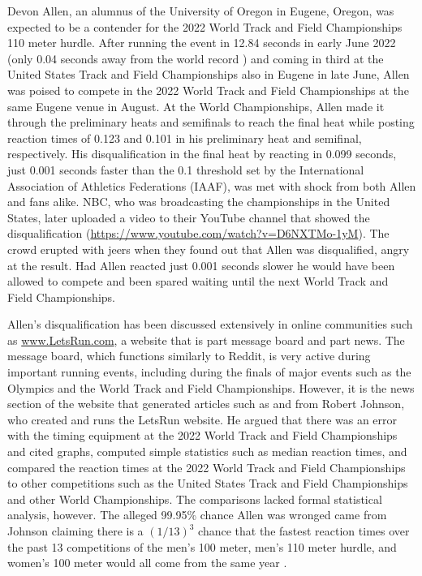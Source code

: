 \documentclass[12pt, letterpaper, titlepage]{article}
\begin{document}
Devon Allen, an alumnus of the University of Oregon in 
Eugene, Oregon, was
expected to be a contender for the 2022 World Track and Field Championships 110 
meter hurdle.  After running the event in 12.84 seconds in early June 2022 
(only 0.04 seconds away from the world record \citep{wa2022preview}) and coming 
in third at the United States Track and Field 
Championships also in Eugene in late June, Allen was poised to compete in the 
2022 World Track and Field Championships at the same Eugene venue in August.
At the World Championships, Allen made it through the preliminary
heats and semifinals to reach the final heat while posting reaction times of 
0.123 and 0.101 in his preliminary heat and semifinal, respectively.  
His disqualification in the final heat by reacting in 0.099 seconds, just 0.001
seconds faster than the 0.1 threshold set by the International Association of
Athletics Federations (IAAF), was met
with shock from both Allen and fans alike.  NBC, who was broadcasting the
championships in the United States, later uploaded a video to their YouTube
channel that showed the disqualification
(\url{https://www.youtube.com/watch?v=D6NXTMo-1yM}).
The crowd erupted with jeers
when they found out that Allen was disqualified, angry at the result.  Had Allen 
reacted just 0.001 seconds slower he would have been allowed to compete and been 
spared waiting until the next World Track and Field Championships.


Allen's disqualification has been discussed extensively in online communities
such as \url{www.LetsRun.com}, a website that is part message board and part
news. The message board,
which functions similarly to Reddit, is very active during important running
events, including during the finals of major events such as
the Olympics and the World Track and Field Championships.  However, it is the
news section of the website that generated articles such as \citet{johnson2022data}
and \citet{johnson2022was} from  Robert Johnson, who created and runs 
the LetsRun website.  He argued that there was an error
with the timing equipment at the 2022 World Track and Field Championships and
cited graphs, computed simple statistics such as median reaction times, and 
compared the reaction times at the 2022 World Track and Field Championships to 
other competitions
such as the United States Track and Field Championships and other World Championships.
The comparisons lacked formal statistical analysis, however. 
The alleged 99.95\% chance Allen was wronged 
came from Johnson claiming there is a $(1/13)^3$ chance that the fastest 
reaction times over the past 13 competitions of the men's 100 meter, men's 110 
meter hurdle, and women's 100 meter would all come from the same year 
\citep{johnson2022was}.
\end{document}
